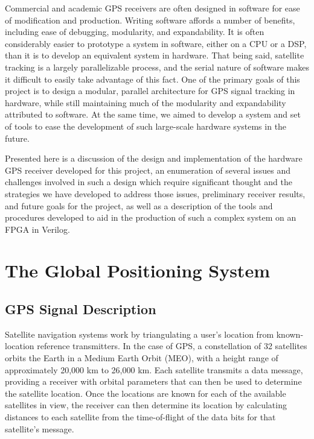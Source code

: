 \documentclass[12pt]{article}
\begin{document}
Commercial and academic GPS receivers are often designed in software for ease of modification and production. Writing software affords a number of benefits, including ease of debugging, modularity, and expandability. It is often considerably easier to prototype a system in software, either on a CPU or a DSP, than it is to develop an equivalent system in hardware. That being said, satellite tracking is a largely parallelizable process, and the serial nature of software makes it difficult to easily take advantage of this fact. One of the primary goals of this project is to design a modular, parallel architecture for GPS signal tracking in hardware, while still maintaining much of the modularity and expandability attributed to software. At the same time, we aimed to develop a system and set of tools to ease the development of such large-scale hardware systems in the future.

Presented here is a discussion of the design and implementation of the hardware GPS receiver developed for this project, an enumeration of several issues and challenges involved in such a design which require significant thought and the strategies we have developed to address those issues, preliminary receiver results, and future goals for the project, as well as a description of the tools and procedures developed to aid in the production of such a complex system on an FPGA in Verilog.

\section{The Global Positioning System}

\subsection{GPS Signal Description}
\label{sec:signal description}
Satellite navigation systems work by triangulating a user's location from known-location reference transmitters. In the case of GPS, a constellation of 32 satellites orbits the Earth in a Medium Earth Orbit (MEO), with a height range of approximately 20,000 km to 26,000 km. Each satellite transmits a data message, providing a receiver with orbital parameters that can then be used to determine the satellite location. Once the locations are known for each of the available satellites in view, the receiver can then determine its location by calculating distances to each satellite from the time-of-flight of the data bits for that satellite's message.
\end{document}

